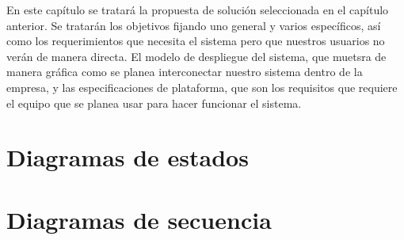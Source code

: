 En este capítulo se tratará la propuesta de solución seleccionada en el capítulo anterior. Se tratarán los objetivos fijando uno general y varios específicos, así como los requerimientos que necesita el sistema pero que nuestros usuarios no verán de manera directa. El modelo de despliegue del sistema, que muetsra de manera gráfica como se planea interconectar nuestro sistema dentro de la empresa, y las especificaciones de plataforma, que son los requisitos que requiere el equipo que se planea usar para hacer funcionar el sistema.

\section{Diagramas de estados}


\section{Diagramas de secuencia}